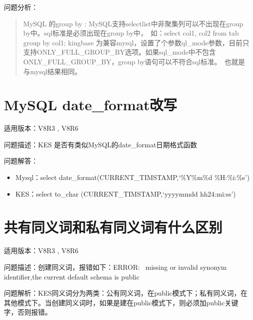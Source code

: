 \documentclass[a4,10pt,oneside,english]{sphinxmanual}
\let\sphinxpxdimen\pdfpxdimen\else\newdimen\sphinxpxdimen
\begin{document}
问题分析：
\begin{quote}

MySQL 的group by : MySQL支持selectlist中非聚集列可以不出现在group by中。sql标准是必须出现在group by中， 如：select col1, col2 from tab group by col1; kingbase 为兼容mysql，设置了个参数ql\_mode参数，目前只支持ONLY\_FULL\_GROUP\_BY选项。如果sql\_mode中不包含ONLY\_FULL\_GROUP\_BY，group by语句可以不符合sql标准。 也就是与mysql结果相同。

\begin{figure}[H]
\centering

\noindent\sphinxincludegraphics[width=650\sphinxpxdimen,height=268\sphinxpxdimen]{{FAQ5663}.png}
\end{figure}
\end{quote}


\section{MySQL date\_format改写}
\label{\detokenize{sql:mysql-date-format}}
适用版本：V8R3 , V8R6

问题描述：KES 是否有类似MySQL的date\_format日期格式函数

问题解答：
\begin{itemize}
\item {} 
Mysql：select date\_format(CURRENT\_TIMSTAMP,‘\%Y\sphinxhyphen{}\%m\sphinxhyphen{}\%d \%H:\%i:\%s’)

\item {} 
KES：select to\_char (CURRENT\_TIMSTAMP,‘yyyy\sphinxhyphen{}mm\sphinxhyphen{}dd hh24:mi:ss’)

\end{itemize}


\section{共有同义词和私有同义词有什么区别}
\label{\detokenize{sql:id9}}
适用版本：V8R3 , V8R6

问题描述：创建同义词，报错如下：ERROR:  missing or invalid synonym identifier,the current default schema is public

问题解析：KES同义词分为两类：公有同义词，在public模式下；私有同义词，在其他模式下。当创建同义词时，如果是建在public模式下，则必须加public关键字，否则报错。
\end{document}
